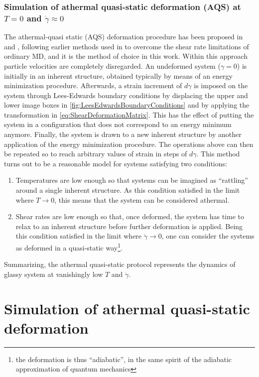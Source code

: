 \subsubsection[Simulation of deformation at $T = 0$ and $\dot{\gamma} \approx 0$]{Simulation of athermal quasi-static deformation (AQS) at $T = 0$ and $\dot{\gamma} \approx 0$}
The athermal-quasi static (AQS) deformation procedure has been proposed in \cite{tanguy2002continuum} and \cite{maloney2006amorphous}, following earlier methods used in \cite{kobayashi1980computer} to overcome the shear rate limitations of ordinary MD, and it is the method of choice in this work.
Within this approach particle velocities are completely disregarded. An undeformed system ($\gamma = 0$) is initially in an inherent structure, obtained typically by means of an energy minimization procedure. Afterwards, a strain increment of $d\gamma$ is imposed on the system through Lees-Edwards boundary conditions by displacing the upper and lower image boxes in \autoref{fig:LeesEdwardsBoundaryConditions} and by applying the transformation in \autoref{eq:ShearDeformationMatrix}. This has the effect of putting the system in a configuration that does not correspond to an energy minimum anymore. Finally, the system is drawn to a new inherent structure by another application of the energy minimization procedure.  The operations above can then be repeated so to reach arbitrary values of strain in steps of $d\gamma$.
This method turns out to be a reasonable model for systems satisfying two conditions:
\begin{enumerate}
\item Temperatures are low enough so that systems can be imagined as ``rattling'' around a single inherent structure. As this condition satisfied in the limit where $T \rightarrow 0$, this means that the system can be considered athermal.
\item Shear rates are low enough so that, once deformed, the system has time to relax to an inherent structure before further deformation is applied. Being this condition satisfied in the limit where $\dot{\gamma} \rightarrow 0$, one can consider the systems as deformed in a quasi-static way\footnote{the deformation is thus ``adiabatic'', in the same spirit of the adiabatic approximation of quantum mechanics}.
\end{enumerate}
Summarizing, the athermal quasi-static protocol represents the dynamics of glassy system at vanishingly low $T$ and $\dot{\gamma}$.

\section{Simulation of athermal quasi-static deformation \label{sec:LJDeformation}}


